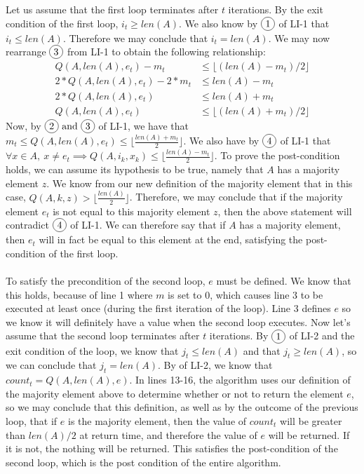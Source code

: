 \documentclass{article}
\newcommand{\floor}[1]{\lfloor #1 \rfloor}
\DeclareRobustCommand*\circled[1]{\tikz[baseline =(char.base)]{\node[shape=circle, draw, inner sep = 2pt] (char) {#1};}}
\begin{document}
\begin{enumerate}
	Let us assume that the first loop terminates after $t$ iterations. By the exit condition of the first loop, $i_t \geq len(A)$. We also know by $\circled{1}$ of LI-1 that $i_t \leq len(A)$. Therefore we may conclude that $i_t = len(A)$. We may now rearrange $\circled{3}$ from LI-1 to obtain the following relationship: 
	\begin{align*}
		Q(A, len(A), e_t) - m_t &\leq \floor{(len(A)-m_t)/2} \\
		2*Q(A, len(A), e_t) - 2*m_t &\leq len(A)-m_t \\
		2*Q(A, len(A), e_t) &\leq len(A) + m_t \\
		Q(A, len(A), e_t) &\leq \floor{(len(A) + m_t)/2}
	\end{align*} 
	Now, by $\circled{2}\ \textrm{and}\ \circled{3}$ of LI-1, we have that $m_t \leq Q(A, len(A), e_t) \leq \floor{\frac{len(A) + m_t}{2}}$. We also have by $\circled{4}$ of LI-1 that $\forall x \in A,\ x \neq e_t \implies Q(A, i_k, x_k) \leq \floor{\frac{len(A) -  m_t}{2}}$. To prove the post-condition holds, we can assume its hypothesis to be true, namely that $A$ has a majority element $z$. We know from our new definition of the majority element that in this case, $Q(A, k, z) > \floor{\frac{len(A)}{2}}$. Therefore, we may conclude that if the majority element $e_t$ is not equal to this majority element $z$, then the above statement will contradict $\circled{4}$ of LI-1. We can therefore say that if $A$ has a majority element, then $e_t$ will in fact be equal to this element at the end, satisfying the post-condition of the first loop. \\\\
	To satisfy the precondition of the second loop, $e$ must be defined. We know that this holds, because of line 1 where $m$ is set to 0, which causes line 3 to be executed at least once (during the first iteration of the loop). Line 3 defines $e$ so we know it will definitely have a value when the second loop executes. Now let's assume that the second loop terminates after $t$ iterations. By $\circled{1}$ of LI-2 and the exit condition of the loop, we know that $j_t 
	\leq len(A)$ and that $j_t \geq len(A)$, so we can conclude that $j_t = len(A)$. By \circled{2} of LI-2, we know that $count_t = Q(A, len(A), e)$. In lines 13-16, the algorithm uses our definition of the majority element above to determine whether or not to return the element $e$, so we may conclude that this definition, as well as by the outcome of the previous loop, that if $e$ is the majority element, then the value of $count_t$ will be greater than $len(A)/2$ at return time, and therefore the value of $e$ will be returned. If it is not, the nothing will be returned. This satisfies the post-condition of the second loop, which is the post condition of the entire algorithm. \\
	

\end{enumerate}
\end{document}
